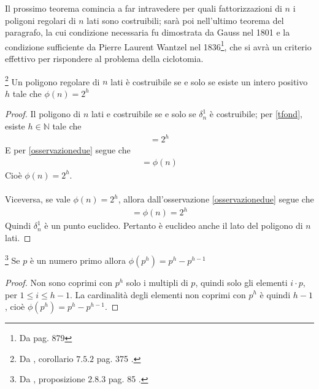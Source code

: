 Il prossimo teorema comincia a far intravedere per quali fattorizzazioni di $n$ i poligoni regolari di $n$ lati sono costruibili; sarà poi nell'ultimo teorema del paragrafo, la cui condizione necessaria fu dimostrata da Gauss nel 1801 e la condizione sufficiente da Pierre Laurent Wantzel nel 1836\footnote{Da \cite{kline} pag. 879}, che si avrà un criterio effettivo per rispondere al problema della ciclotomia.

\begin{teorema}\footnote{Da \cite{cattaneo}, corollario $7.5.2$ pag. 375 .} \label{teoremaprimo}
Un poligono regolare di $n$ lati è costruibile se e solo se esiste un intero positivo $h$ tale che $\phi(n) = 2^h$
\end{teorema}

\begin{proof}
Il poligono di $n$ lati e costruibile se e solo se $\delta_{n}^{1}$ è costruibile; per \ref{tfond}, esiste $h \in \mathbb{N}$ tale che 
\begin{align*} 
[\mathbb{Q}(\delta_{n}^{1}): \mathbb{Q}] = 2^h
\end{align*}
E per \ref{osservazionedue} segue che
\begin{align*} 
[\mathbb{Q}(\delta_{n}^{1}): \mathbb{Q}] = \phi(n)
\end{align*}
Cioè $\phi(n) = 2^h$.
\\\\
Viceversa, se vale $\phi(n) = 2^h$, allora dall'osservazione \ref{osservazionedue} segue che
\begin{align*} 
[\mathbb{Q}(\delta_{n}^{1}): \mathbb{Q}] = \phi(n) = 2^h
\end{align*}
Quindi $\delta_{n}^{1}$ è un punto euclideo. Pertanto è euclideo anche il lato del poligono di $n$ lati.
\end{proof}

\begin{lemmax}\footnote{Da \cite{cattaneo}, proposizione $2.8.3$ pag. 85 .} \label{lemmaprimo}
Se $p$ è un numero primo allora $\phi(p^h) = p^h - p^{h-1}$
\end{lemmax}

\begin{proof}
Non sono coprimi con $p^h$ solo i multipli di $p$, quindi solo gli elementi $i \cdot p$, per $1 \leq i \leq h-1$. La cardinalità degli elementi non coprimi con $p^h$ è quindi $h-1$, cioè $\phi(p^h) = p^h - p^{h-1}$.
\end{proof}

